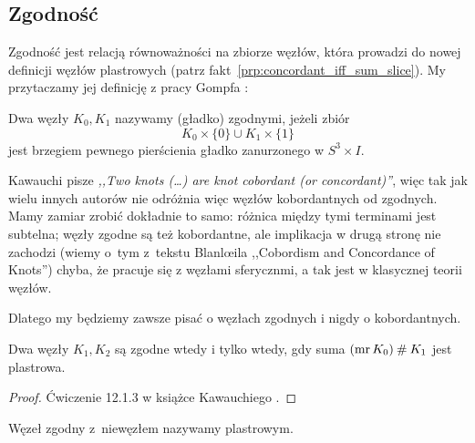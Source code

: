
\subsection{Zgodność}
Zgodność jest relacją równoważności na zbiorze węzłów, która prowadzi do nowej definicji węzłów plastrowych (patrz fakt~\ref{prp:concordant_iff_sum_slice}).
My przytaczamy jej definicję z pracy Gompfa \cite{gompf1986}:

\begin{definition}[zgodność]
%
    Dwa węzły $K_0, K_1$ nazywamy (gładko) zgodnymi, jeżeli zbiór
    \begin{equation}
        K_0 \times \{0\} \cup K_1 \times \{1\}
    \end{equation}
    jest brzegiem pewnego pierścienia gładko zanurzonego w $S^3 \times I$.
\end{definition}

Kawauchi \cite[s. 156]{kawauchi1996} pisze \emph{,,Two knots (…) are knot cobordant (or concordant)''}, więc tak jak wielu innych autorów nie odróżnia więc węzłów kobordantnych od zgodnych.
Mamy zamiar zrobić dokładnie to samo: różnica między tymi terminami jest subtelna; węzły zgodne są też kobordantne, ale implikacja w drugą stronę nie zachodzi (wiemy o~tym z~tekstu Blanlœila ,,Cobordism and Concordance of Knots'') chyba, że pracuje się z węzłami sferycznmi, a tak jest w klasycznej teorii węzłów.
%

Dlatego my będziemy zawsze pisać o węzłach zgodnych i nigdy o kobordantnych.

\begin{proposition}
\label{prp:concordant_iff_sum_slice}%
    Dwa węzły $K_1, K_2$ są zgodne wtedy i tylko wtedy, gdy suma $(\operatorname{mr} K_0) \mathbin{\#} K_1$ jest plastrowa.
%
%
\end{proposition}

\begin{proof}
    Ćwiczenie 12.1.3 w książce Kawauchiego \cite{kawauchi1996}.
\end{proof}

\begin{definition}
    Węzeł zgodny z~niewęzłem nazywamy plastrowym.
%
\end{definition}

